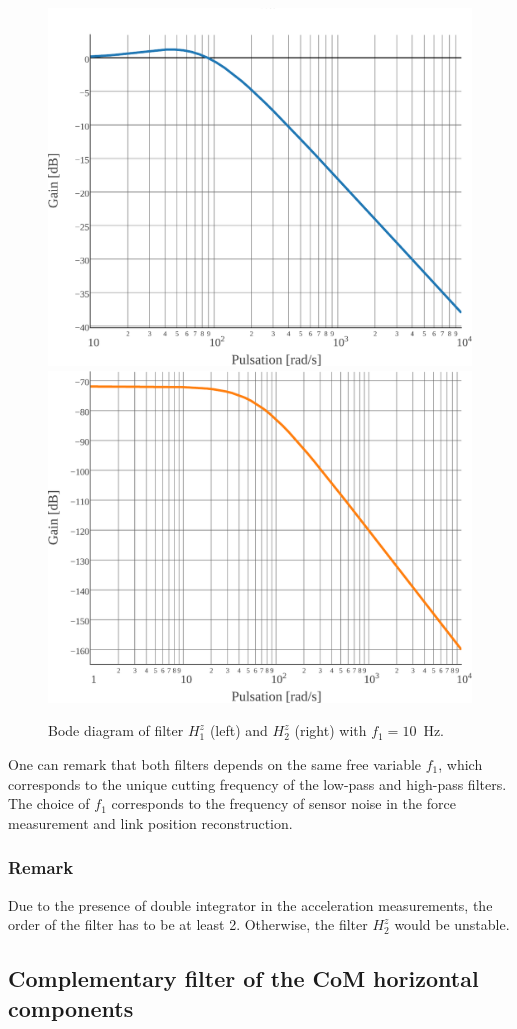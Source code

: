  \begin{figure}
       \begin{center}
               \includegraphics[width=0.49\columnwidth]{fig/H1_z}
               \includegraphics[width=0.49\columnwidth]{fig/H2_z}
       \end{center}
       \caption{Bode diagram of filter $H^{z}_{1}$ (left) and $H^{z}_{2}$ (right) with \mbox{$f_{1} = 10$ Hz.}}
       \label{fig:bd_z}
 \end{figure}

One can remark that both filters depends on the same free variable $f_{1}$, which corresponds to the unique cutting frequency of the low-pass and high-pass filters. The choice of $f_{1}$ corresponds to the frequency of sensor noise in the force measurement and link position reconstruction.

\subsubsection*{Remark} Due to the presence of double integrator in the acceleration measurements, the order of the filter has to be at least 2. Otherwise, the filter $H_2^z$ would be unstable.
 
\subsection{Complementary filter of the CoM horizontal components}

